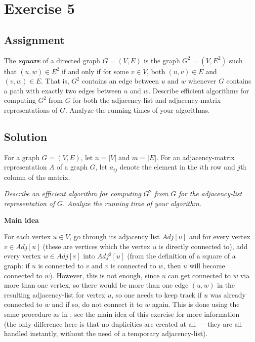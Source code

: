 
\section*{Exercise 5}
\label{sec:Ex5}

\subsection*{Assignment}

The \textit{\textbf{square}} of a directed graph $G = (V, E)$ is the graph
$G^{2} = (V, E^{2})$ such that $(u, w) \in E^{2}$ if and only if for some $v
\in V$, both $(u, v) \in E$ and $(v, w) \in E$. That is, $G^{2}$ contains an
edge between $u$ and $w$ whenever $G$ contains a path with exactly two edges
between $u$ and $w$. Describe efficient algorithms for computing $G^{2}$ from
$G$ for both the adjacency-list and adjacency-matrix representations of $G$.
Analyze the running times of your algorithms.

\subsection*{Solution}

For a graph $G = (V, E)$, let $n = |V|$ and $m = |E|$. For an adjacency-matrix
representation $A$ of a graph $G$, let $a_{ij}$ denote the element in the $i$th
row and $j$th column of the matrix.

\textit{Describe an efficient algorithm for computing $G^{2}$ from $G$ for the
adjacency-list representation of $G$. Analyze the running time of your
algorithm.}

\textbf{Main idea}

For each vertex $u \in V$, go through its adjacency list $Adj[u]$ and for every
vertex $v \in Adj[u]$ (these are vertices which the vertex $u$ is directly
connected to), add every vertex $w \in Adj[v]$ into $Adj^{2}[u]$ (from the
definition of a square of a graph: if $u$ is connected to $v$ and $v$ is
connected to $w$, then $u$ will become connected to $w$). However, this is not
enough, since $u$ can get connected to $w$ via more than one vertex, so there
would be more than one edge $(u, w)$ in the resulting adjacency-list for vertex
$u$, so one needs to keep track if $u$ was already connected to $w$ and if so,
do not connect it to $w$ again. This is done using the same procedure as in
; see the main idea of this exercise for more information (the
only difference here is that no duplicities are created at all --- they are all
handled instantly, without the need of a temporary adjacency-list).

